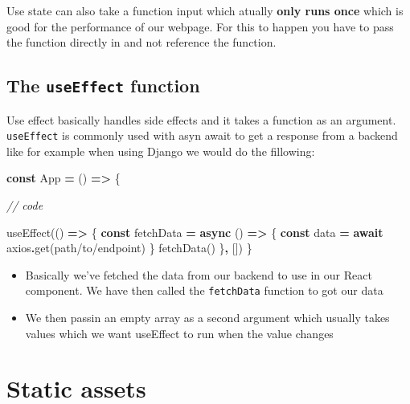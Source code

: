 \documentclass[
]{report}
\newenvironment{Shaded}{\begin{snugshade}}{\end{snugshade}}
\newcommand{\CommentTok}[1]{\textcolor[rgb]{0.56,0.35,0.01}{\textit{#1}}}
\newcommand{\ControlFlowTok}[1]{\textcolor[rgb]{0.13,0.29,0.53}{\textbf{#1}}}
\newcommand{\FunctionTok}[1]{\textcolor[rgb]{0.00,0.00,0.00}{#1}}
\newcommand{\KeywordTok}[1]{\textcolor[rgb]{0.13,0.29,0.53}{\textbf{#1}}}
\newcommand{\NormalTok}[1]{#1}
\newcommand{\OperatorTok}[1]{\textcolor[rgb]{0.81,0.36,0.00}{\textbf{#1}}}
\newcommand{\StringTok}[1]{\textcolor[rgb]{0.31,0.60,0.02}{#1}}
\providecommand{\tightlist}{%
  \setlength{\itemsep}{0pt}\setlength{\parskip}{0pt}}
\begin{document}
Use state can also take a function input which atually \textbf{only runs once} which
is good for the performance of our webpage. For this to happen you have to pass
the function directly in and not reference the function.

\hypertarget{the-useeffect-function}{%
\section{\texorpdfstring{The \texttt{useEffect} function}{The useEffect function}}\label{the-useeffect-function}}

Use effect basically handles side effects and it takes a function as an
argument. \texttt{useEffect} is commonly used with asyn await to get a response from a
backend like for example when using Django we would do the fillowing:

\begin{Shaded}
\begin{Highlighting}[]
\KeywordTok{const}\NormalTok{ App }\OperatorTok{=}\NormalTok{ () }\KeywordTok{=\textgreater{}}\NormalTok{ \{}

\CommentTok{// code}

    \FunctionTok{useEffect}\NormalTok{(() }\KeywordTok{=\textgreater{}}\NormalTok{ \{}
        \KeywordTok{const}\NormalTok{ fetchData }\OperatorTok{=} \KeywordTok{async}\NormalTok{ () }\KeywordTok{=\textgreater{}}\NormalTok{ \{}
            \KeywordTok{const}\NormalTok{ data }\OperatorTok{=} \ControlFlowTok{await}\NormalTok{ axios}\OperatorTok{.}\FunctionTok{get}\NormalTok{(}\StringTok{\textquotesingle{}path/to/endpoint\textquotesingle{}}\NormalTok{)}
\NormalTok{        \}}
        \FunctionTok{fetchData}\NormalTok{()}
\NormalTok{    \}}\OperatorTok{,}\NormalTok{ [])}
\NormalTok{\}}
\end{Highlighting}
\end{Shaded}

\begin{itemize}
\tightlist
\item
  Basically we've fetched the data from our backend to use in our React
  component. We have then called the \texttt{fetchData} function to got our data
\item
  We then passin an empty array as a second argument which usually takes values
  which we want useEffect to run when the value changes
\end{itemize}

\hypertarget{static-assets}{%
\chapter{Static assets}\label{static-assets}}
\end{document}
